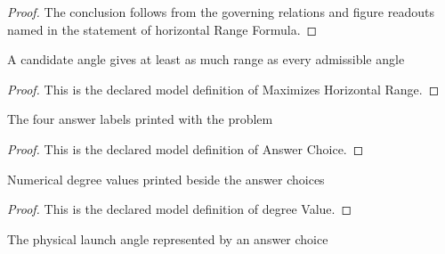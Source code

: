 \begin{proof}
  The conclusion follows from the governing relations and figure readouts named in the statement of horizontal Range Formula.
\end{proof}
\begin{definition}
  \label{def:physics:phyx-mini-0796:phyxminiproblems-problemphyxmini0796-maximizeshorizontalrange}
  A candidate angle gives at least as much range as every admissible angle
\end{definition}
\begin{proof}
  This is the declared model definition of Maximizes Horizontal Range.
\end{proof}
\begin{definition}
  \label{def:physics:phyx-mini-0796:phyxminiproblems-problemphyxmini0796-answerchoice}
  The four answer labels printed with the problem
\end{definition}
\begin{proof}
  This is the declared model definition of Answer Choice.
\end{proof}
\begin{definition}
  \label{def:physics:phyx-mini-0796:phyxminiproblems-problemphyxmini0796-answerchoice-degreevalue}
  Numerical degree values printed beside the answer choices
\end{definition}
\begin{proof}
  This is the declared model definition of degree Value.
\end{proof}
\begin{definition}[angle]
  \label{def:physics:phyx-mini-0796:phyxminiproblems-problemphyxmini0796-answerchoice-angle}
  The physical launch angle represented by an answer choice
\end{definition}
